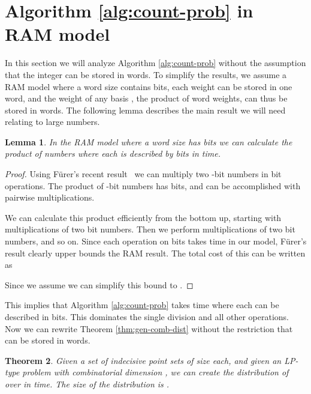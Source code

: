\documentclass{journal}
\newtheorem {theorem}{Theorem}[section]
\newtheorem {lemma}[theorem]{Lemma}
\begin{document}
\section{Algorithm \ref{alg:count-prob} in RAM model}
\label{sec:bignum}
In this section we will analyze Algorithm \ref{alg:count-prob} without the assumption that the integer  can be stored in  words.  
To simplify the results, we assume a RAM model where a word size contains  bits, each weight  can be stored in one word, and the weight of any basis , the product of   word weights, can thus be stored in  words.
The following lemma describes the main result we will need relating to large numbers.
\begin{lemma}
In the RAM model where a word size has  bits we can calculate the product of  numbers where each is described by  bits in  time.
\end{lemma}
\begin{proof}
Using F\"urer's recent result~\cite{Fur09} we can multiply two -bit numbers in  bit operations.  The product of  -bit numbers has  bits, and can be accomplished with  pairwise multiplications.

We can calculate this product efficiently from the bottom up, starting with  multiplications of two  bit numbers.  Then we perform  multiplications of two  bit numbers, and so on.  Since each operation on  bits takes  time in our model, F\"urer's result clearly upper bounds the RAM result.
The total cost of this can be written as

Since we assume  we can simplify this bound to .
\end{proof}

This implies that Algorithm \ref{alg:count-prob} takes  time where each  can be described in  bits.  This dominates the single division and all other operations.  
Now we can rewrite Theorem \ref{thm:gen-comb-dist} without the restriction that  can be stored in  words.  

\begin{theorem}
Given a set  of  indecisive point sets of size  each, and given an LP-type problem  with combinatorial dimension , we can create the distribution of  over  in  time.  The size of the distribution is .
\label{thm:gen-comb-dist-bignum}
\end{theorem}
\end{document}
